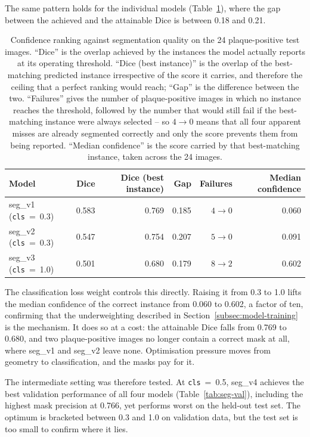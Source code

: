 The same pattern holds for the individual models (Table~\ref{tab:oracle}), where the gap
between the achieved and the attainable Dice is between 0.18 and 0.21.

\begin{table}[H]
\centering
\caption[Confidence-ranking analysis]{Confidence ranking against segmentation quality on the 24
plaque-positive test images. ``Dice'' is the overlap achieved by the instances the model actually
reports at its operating threshold. ``Dice (best instance)'' is the overlap of the best-matching
predicted instance irrespective of the score it carries, and therefore the ceiling that a perfect
ranking would reach; ``Gap'' is the difference between the two. ``Failures'' gives the number of
plaque-positive images in which no instance reaches the threshold, followed by the number that
would still fail if the best-matching instance were always selected -- so $4 \rightarrow 0$ means
that all four apparent misses are already segmented correctly and only the score prevents them
from being reported. ``Median confidence'' is the score carried by that best-matching instance,
taken across the 24 images.}
\label{tab:oracle}
\begin{tabular}{lrrrrr}
\hline
Model & Dice & Dice (best instance) & Gap & Failures & Median confidence \\
\hline
seg\_v1 (\texttt{cls}~=~0.3) & 0.583 & 0.769 & 0.185 & $4 \rightarrow 0$ & 0.060 \\
seg\_v2 (\texttt{cls}~=~0.3) & 0.547 & 0.754 & 0.207 & $5 \rightarrow 0$ & 0.091 \\
seg\_v3 (\texttt{cls}~=~1.0) & 0.501 & 0.680 & 0.179 & $8 \rightarrow 2$ & 0.602 \\
\hline
\end{tabular}
\end{table}

The classification loss weight controls this directly. Raising it from 0.3 to 1.0 lifts the median
confidence of the correct instance from 0.060 to 0.602, a factor of ten, confirming that the
underweighting described in Section~\ref{subsec:model-training} is the mechanism. It does so at a
cost: the attainable Dice falls from 0.769 to 0.680, and two plaque-positive images no longer
contain a correct mask at all, where seg\_v1 and seg\_v2 leave none. Optimisation pressure moves
from geometry to classification, and the masks pay for it.

The intermediate setting was therefore tested. At \texttt{cls}~=~0.5, seg\_v4 achieves the best
validation performance of all four models (Table~\ref{tab:seg-val}), including the highest mask
precision at 0.766, yet performs worst on the held-out test set. The optimum is bracketed between
0.3 and 1.0 on validation data, but the test set is too small to confirm where it lies.

